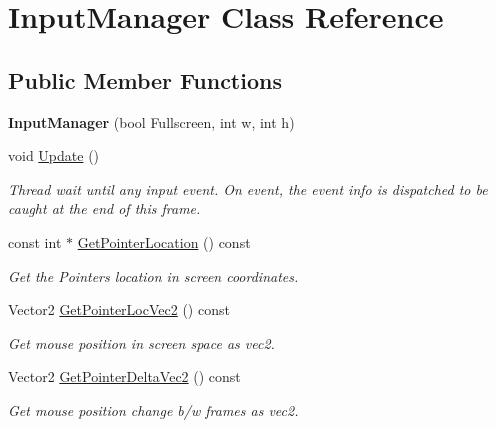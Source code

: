 \hypertarget{classInputManager}{}\section{Input\+Manager Class Reference}
\label{classInputManager}
\subsection*{Public Member Functions}
\begin{DoxyCompactItemize}
\item 
\mbox{\label{classInputManager_a1300c9e28dfad60423cd2cda4451fc46}} 
{\bfseries Input\+Manager} (bool Fullscreen, int w, int h)
\item 
\mbox{\label{classInputManager_aa5480931dba2720e7d80dd00a53adae0}} 
void \hyperlink{classInputManager_aa5480931dba2720e7d80dd00a53adae0}{Update} ()
\begin{DoxyCompactList}\small\item\em Thread wait until any input event. On event, the event info is dispatched to be caught at the end of this frame. \end{DoxyCompactList}\item 
const int $\ast$ \hyperlink{classInputManager_ab8fb90f6385afb41d9d8212851c04061}{Get\+Pointer\+Location} () const
\begin{DoxyCompactList}\small\item\em Get the Pointer\textquotesingle{}s location in screen coordinates. \end{DoxyCompactList}\item 
Vector2 \hyperlink{classInputManager_a6d5e2b6637bb959377f218bb4b3d748e}{Get\+Pointer\+Loc\+Vec2} () const
\begin{DoxyCompactList}\small\item\em Get mouse position in screen space as vec2. \end{DoxyCompactList}\item 
Vector2 \hyperlink{classInputManager_a48091a18d5c514a1dc8226aa4b134b4d}{Get\+Pointer\+Delta\+Vec2} () const
\begin{DoxyCompactList}\small\item\em Get mouse position change b/w frames as vec2. \end{DoxyCompactList}\item 
\mbox{\label{classInputManager_a5f50a09fddead4a37e194e8fa75224fc}} 

\end{DoxyCompactItemize}
